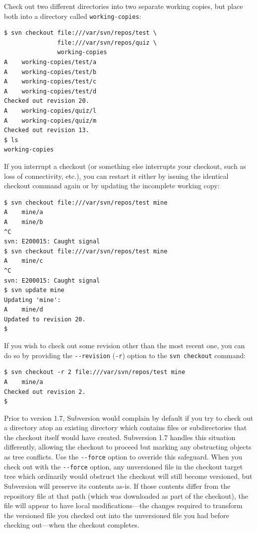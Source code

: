 Check out two different directories into two separate working copies,
but place both into a directory called \texttt{working-copies}:

\begin{verbatim}
$ svn checkout file:///var/svn/repos/test \
               file:///var/svn/repos/quiz \
               working-copies
A    working-copies/test/a
A    working-copies/test/b
A    working-copies/test/c
A    working-copies/test/d
Checked out revision 20.
A    working-copies/quiz/l
A    working-copies/quiz/m
Checked out revision 13.
$ ls
working-copies
\end{verbatim}

If you interrupt a checkout (or something else interrupts your checkout,
such as loss of connectivity, etc.), you can restart it either by
issuing the identical checkout command again or by updating the
incomplete working copy:

\begin{verbatim}
$ svn checkout file:///var/svn/repos/test mine
A    mine/a
A    mine/b
^C
svn: E200015: Caught signal
$ svn checkout file:///var/svn/repos/test mine
A    mine/c
^C
svn: E200015: Caught signal
$ svn update mine
Updating 'mine':
A    mine/d
Updated to revision 20.
$
\end{verbatim}

If you wish to check out some revision other than the most recent one,
you can do so by providing the \texttt{-\/-revision} (\texttt{-r})
option to the \texttt{svn\ checkout} command:

\begin{verbatim}
$ svn checkout -r 2 file:///var/svn/repos/test mine
A    mine/a
Checked out revision 2.
$
\end{verbatim}

Prior to version 1.7, Subversion would complain by default if you try to
check out a directory atop an existing directory which contains files or
subdirectories that the checkout itself would have created. Subversion
1.7 handles this situation differently, allowing the checkout to proceed
but marking any obstructing objects as tree conflicts. Use the
\texttt{-\/-force} option to override this safeguard. When you check out
with the \texttt{-\/-force} option, any unversioned file in the checkout
target tree which ordinarily would obstruct the checkout will still
become versioned, but Subversion will preserve its contents as-is. If
those contents differ from the repository file at that path (which was
downloaded as part of the checkout), the file will appear to have local
modifications---the changes required to transform the versioned file you
checked out into the unversioned file you had before checking out---when
the checkout completes.

